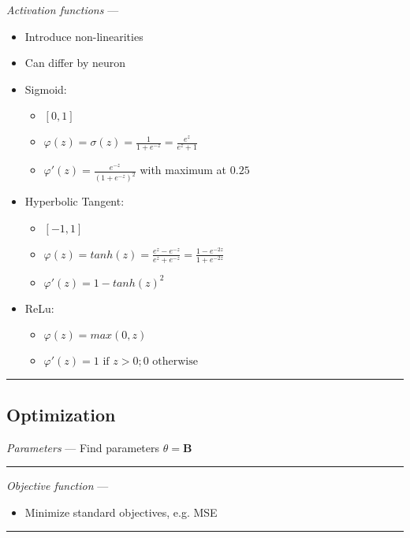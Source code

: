 \emph{Activation functions} --- 
\begin{itemize}
    \item Introduce non-linearities
    \item Can differ by neuron
    \item Sigmoid:
    \begin{itemize}
        \item $[0,1]$
        \item $\varphi(z) = \sigma(z) =  \frac{1}{1+e^{-z}} = \frac{e^z}{e^z + 1}$
        \item $\varphi'(z) = \frac{e^{-z}}{(1+e^{-z})^2}$ with maximum at $0.25$
    \end{itemize}
    \item Hyperbolic Tangent:
    \begin{itemize}
        \item $[-1,1]$
        \item $\varphi(z) = tanh(z) =  \frac{e^z - e^{-z}}{e^z + e^{-z}} = \frac{1 - e^{-2z}}{1 + e^{-2z}}$
        \item $\varphi'(z) = 1-tanh(z)^2$
    \end{itemize}
    \item ReLu:
    \begin{itemize}
        \item $\varphi(z) = max(0,z)$
        \item $\varphi'(z) = 1 \textrm{ if } z > 0; 0 \textrm { otherwise}$
    \end{itemize}
\end{itemize}

{\color{black}\hrule height 0.001mm}

\subsection*{Optimization}
\emph{Parameters} --- Find parameters $\theta = \boldsymbol{B}$

{\color{lightgray}\hrule height 0.001mm}

\emph{Objective function} --- 
\begin{itemize}
    \item Minimize standard objectives, e.g. MSE
\end{itemize}

{\color{lightgray}\hrule height 0.001mm}

